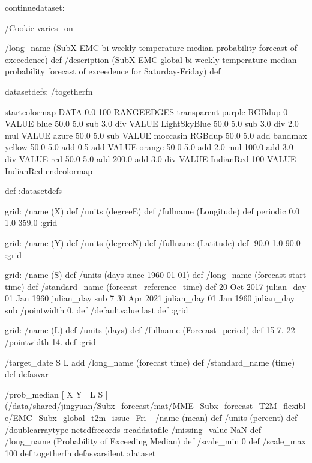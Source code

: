 \begin{ingrid}

continuedataset:



/Cookie varies_on


/long_name (SubX EMC bi-weekly temperature median probability forecast of exceedence) def
/description (SubX EMC global bi-weekly temperature median probability forecast of exceedence for Saturday-Friday) def

datasetdefs:
/togetherfn {
startcolormap 
DATA 0.0 100 RANGEEDGES
    transparent purple RGBdup
       0 VALUE
       blue 50.0
         5.0 sub
         3.0 div
         VALUE
         LightSkyBlue 50.0
          5.0 sub
          3.0 div
          2.0 mul
          VALUE
          azure 50.0
           5.0 sub
           VALUE
          moccasin RGBdup 50.0
             5.0 add
             bandmax
             yellow 50.0
              5.0 add
              0.5 add
              VALUE
              orange 50.0
               5.0 add
               2.0 mul
               100.0 add
               3.0 div
               VALUE
               red 50.0
                5.0 add
                200.0 add
                3.0 div
                VALUE
               IndianRed
                100 VALUE
                IndianRed
endcolormap

} def
:datasetdefs


grid:
/name (X) def
/units (degreeE) def
/fullname (Longitude) def
periodic
0.0 1.0 359.0
:grid

grid:
/name (Y) def
/units (degreeN) def
/fullname (Latitude) def
-90.0 1.0 90.0
:grid


grid:
/name (S) def
/units (days since 1960-01-01) def
/long_name (forecast start time) def
/standard_name (forecast_reference_time) def
20 Oct 2017 julian_day 01 Jan 1960 julian_day sub
7
30 Apr 2021 julian_day 01 Jan 1960 julian_day sub
/pointwidth 0. def
/defaultvalue { last } def
:grid

grid:
/name (L) def
/units (days) def
/fullname (Forecast_period) def
15 7. 22
/pointwidth 14. def
:grid

/target_date { S L add /long_name (forecast time) def /standard_name (time) def } defasvar


/prob_median {
[ X Y | L S ] (/data/shared/jingyuan/Subx_forecast/mat/MME_Subx_forecast_T2M_flexible/EMC_Subx_global_t2m_issue_Fri_%
/name (mean) def
/units (percent) def
/doublearraytype netcdfrecords :readdatafile
/missing_value NaN def
/long_name (Probability of Exceeding Median) def
/scale_min 0 def
/scale_max 100 def
togetherfn
} defasvarsilent
:dataset
\end{ingrid}
